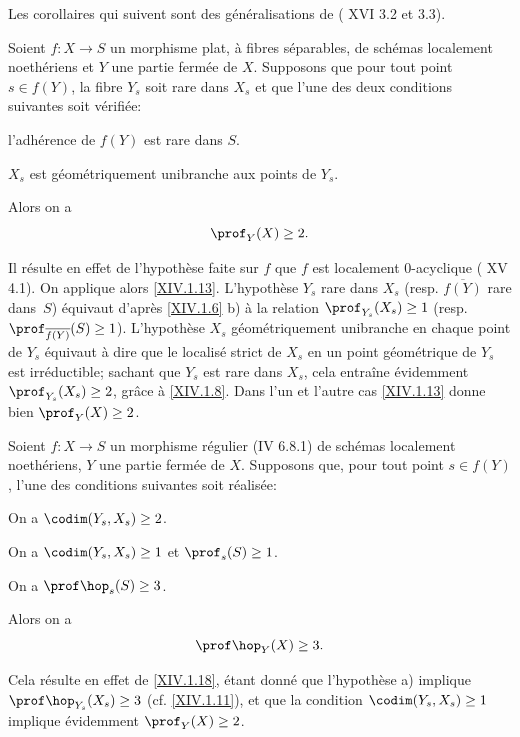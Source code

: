 Les corollaires qui suivent sont des g\'en\'eralisations de ( XVI 3.2 et 3.3).

\begin{corollaire} \label{XIV.1.19}
Soient $f:X\to S$ un morphisme plat, \`a fibres s\'eparables, de sch\'emas localement noeth\'eriens et $Y$ une partie ferm\'ee de $X$. Supposons que pour tout point $s\in f(Y)$, la fibre $Y_s$ soit rare dans $X_s$ et que l'une des deux conditions suivantes soit v\'erifi\'ee:
\begin{enumeratea}
\item
l'adh\'erence de $f(Y)$ est rare dans $S$.
\item
$X_s$ est g\'eom\'etriquement unibranche aux points de $Y_s$.
\par\noindent
Alors on a
$$
\prof_Y(X)\geq 2.
$$
\end{enumeratea}
\end{corollaire}

Il r\'esulte en effet de l'hypoth\`ese faite sur $f$ que $f$ est localement $0$-acyclique ( XV 4.1). On applique alors \ref{XIV.1.13}. L'hypoth\`ese $Y_s$ rare dans $X_s$ (resp. $\overline{f(Y)}$ rare dans~$S$) \'equivaut d'apr\`es \ref{XIV.1.6} b) \`a la relation $\prof_{Y_s}(X_s)\geq 1$ (resp. $\prof_{\overline{f(Y)}}(S)\geq 1$). L'hypoth\`ese $X_s$ g\'eom\'etriquement unibranche en chaque point de $Y_s$ \'equivaut \`a dire que le localis\'e strict de $X_s$ en un point g\'eom\'etrique de $Y_s$ est irr\'eductible; sachant que $Y_s$ est rare dans $X_s$, cela entra\^ine \'evidemment $\prof_{Y_s}(X_s)\geq 2$, gr\^ace \`a \ref{XIV.1.8}. Dans l'un et l'autre cas \ref{XIV.1.13} donne bien $\prof_Y(X)\geq 2$.

\begin{corollaire} \label{XIV.1.20}
Soient $f:X\to S$ un morphisme r\'egulier (\textup{\EGA IV 6.8.1}) de sch\'emas localement noeth\'eriens, $Y$ une partie ferm\'ee de $X$. Supposons que, pour tout point $s\in f(Y)$, l'une des conditions suivantes soit r\'ealis\'ee:
\begin{enumeratea}
\item
On a $\codim(Y_s, X_s)\geq 2$.
\item
On a $\codim(Y_s, X_s)\geq 1$ et $\prof_s(S)\geq 1$.
\item
On a $\prof\hop_s(S)\geq 3$.
\end{enumeratea}
\noindent
Alors on a
$$
\prof\hop_Y(X)\geq 3.
$$
\end{corollaire}

Cela r\'esulte en effet de \ref{XIV.1.18}, \'etant donn\'e que l'hypoth\`ese a) implique $\prof\hop_{Y_s}(X_s)\geq 3$ (cf. \ref{XIV.1.11}), et que la condition $\codim(Y_s, X_s)\geq 1$ implique \'evidemment $\prof_Y(X)\geq 2$.

